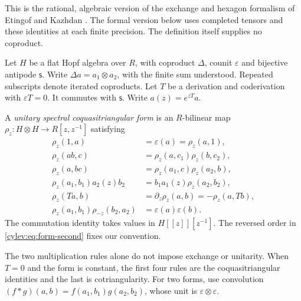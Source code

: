 This is the rational, algebraic version of the exchange and hexagon
formalism of Etingof and Kazhdan
\cite[\S\S1.3--1.4]{EtingofKazhdanV}.
The formal version below uses completed tensors and these identities
at each finite precision. The definition itself supplies no coproduct.

Let $H$ be a flat Hopf algebra over $R$, with coproduct $\Delta$,
counit $\varepsilon$ and bijective antipode $\mathsf s$.
Write $\Delta a=a_1\otimes a_2$, with the finite sum understood.
Repeated subscripts denote iterated coproducts.
Let $T$ be a derivation and coderivation with $\varepsilon T=0$.
It commutes with $\mathsf s$. Write $a(z)=e^{zT}a$.

\begin{definition}\label{cylev:def:form}
A \emph{unitary spectral coquasitriangular form} is an $R$-bilinear
map $\rho_z:H\otimes H\to R[z,z^{-1}]$ satisfying
\begin{align}
 \rho_z(1,a)&=\varepsilon(a)=\rho_z(a,1),
       \label{cylev:eq:form-unit}\\
 \rho_z(ab,c)&=\rho_z(a,c_1)\rho_z(b,c_2),
       \label{cylev:eq:form-first}\\
 \rho_z(a,bc)&=\rho_z(a_1,c)\rho_z(a_2,b),
       \label{cylev:eq:form-second}\\
 \rho_z(a_1,b_1)a_2(z)b_2
       &=b_1a_1(z)\rho_z(a_2,b_2),
       \label{cylev:eq:form-commutation}\\
 \rho_z(Ta,b)&=\partial_z\rho_z(a,b)=-\rho_z(a,Tb),
       \label{cylev:eq:form-translation}\\
 \rho_z(a_1,b_1)\rho_{-z}(b_2,a_2)
       &=\varepsilon(a)\varepsilon(b).
       \label{cylev:eq:form-unitarity}
\end{align}
The commutation identity takes values in $H[[z]][z^{-1}]$.
The reversed order in \eqref{cylev:eq:form-second} fixes our convention.
\end{definition}

The two multiplication rules alone do not impose exchange or unitarity.
When $T=0$ and the form is constant, the first four rules are the
coquasitriangular identities and the last is cotriangularity.
For two forms, use convolution
$(f*g)(a,b)=f(a_1,b_1)g(a_2,b_2)$, whose unit is
$\varepsilon\otimes\varepsilon$.

